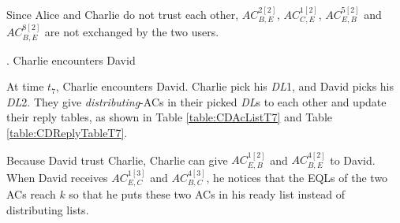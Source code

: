 Since Alice and Charlie do not trust each other, ${AC}^{2\left[2\right]}_{B,E}$, ${AC}^{1\left[2\right]}_{C,E}$, ${AC}^{5\left[2\right]}_{E,B}$ and ${AC}^{8\left[2\right]}_{B,E}$ are not exchanged by the two users.

.  Charlie encounters David

At time ${t}_{7}$, Charlie encounters David. Charlie pick his \textit{DL}1, and David picks his \textit{DL}2. They give \textit{distributing}-ACs in their picked \textit{DL}s to each other and update their reply tables, as shown in Table \ref{table:CDAcListT7} and Table \ref{table:CDReplyTableT7}.

Because David trust Charlie, Charlie can give ${AC}^{1\left[2\right]}_{E,B}$ and ${AC}^{4\left[2\right]}_{B,E}$ to David. When David receives ${AC}^{1\left[3\right]}_{E,C}$ and ${AC}^{4\left[3\right]}_{B,C}$, he notices that the EQLs of the two ACs reach ${k}$ so that he puts these two ACs in his ready list instead of distributing lists.

